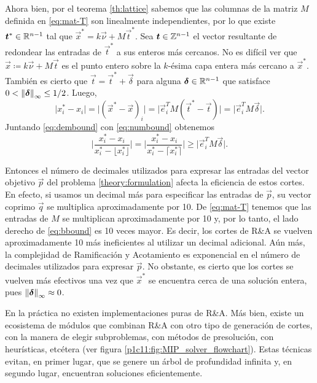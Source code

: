 Ahora bien, por el teorema \ref{th:lattice} sabemos que las columnas de la matriz $M$ definida en
\eqref{eq:mat-T} son linealmente independientes, por lo que existe $\boldsymbol{t}^* \in \mathbb{R}^{n-1}$ tal que
$\vec{x}^* = k\vec{\nu} + M\vec{t}^*$. Sea $\boldsymbol{t} \in \mathbb{Z}^{n-1}$ el vector resultante de redondear
las entradas de $\vec{t}^*$ a sus enteros más cercanos. No es difícil ver que $\vec{x}
\coloneq k\vec{\nu} + M\vec{t}$ es el punto entero sobre la $k$-ésima capa entera más cercano a
$\vec{x}^*$. También es cierto que $\vec{t} = \vec{t}^* + \vec{\delta}$ para alguna $\boldsymbol{\delta}
\in \mathbb{R}^{n-1}$ que satisface $0 < \left\lVert \boldsymbol{\delta} \right\rVert_\infty \leq 1/2$. Luego,
\begin{equation}
	\label{eq:numbound}
	\big| x^*_i - x_i \big| =
	\big| \left(\vec{x}^* - \vec{x}\right)_i \big| =
	\big| \vec{e}_i^TM\left(\vec{t}^* - \vec{t}\right) \big| =
	\big| \vec{e}_i^TM\vec{\delta} \big|.
\end{equation}
Juntando \eqref{eq:dembound} con \eqref{eq:numbound} obtenemos
\begin{equation}
	\label{eq:bbound}
	\bigg| \frac{x_i^* - x_i}{x_i^* - \big\lfloor x_i^*\big\rfloor} \bigg| =
	\bigg| \frac{x_i^* - x_i}{x_i^* - \big\lceil x_i^*\big\rceil} \bigg|
	\geq \big|\vec{e}_i^TM\vec{\delta}\big|.
\end{equation}

Entonces el número de decimales utilizados para expresar las entradas del vector objetivo $\vec{p}$ del problema
\eqref{theory:formulation} afecta la eficiencia de estos cortes. En efecto, si usamos
un decimal más para especificar las entradas de $\vec{p}$, su vector coprimo $\vec{q}$ se
multiplica aproximadamente por 10. De \eqref{eq:mat-T} tenemos que las entradas de $M$ se
multiplican aproximadamente por 10 y, por lo tanto, el lado derecho de \eqref{eq:bbound} es 10 veces mayor.
Es decir, los cortes de R\&A se vuelven aproximadamente 10 más ineficientes al utilizar un decimal
adicional. Aún más, la complejidad de Ramificación y Acotamiento es exponencial en el número de
decimales utilizados para expresar $\vec{p}$. No obstante, es cierto que los cortes se vuelven más
efectivos una vez que $\vec{x}^*$ se encuentra cerca de una solución entera, pues
$\left\lVert \boldsymbol{\delta} \right\rVert_\infty \approx 0$.

En la práctica no existen implementaciones puras de R\&A. Más bien, existe un
ecosistema de módulos que combinan R\&A con otro tipo de generación de cortes, con la manera de
elegir subproblemas, con métodos de presolución, con heurísticas, etcétera (ver figura
\ref{p1c11:fig:MIP_solver_flowchart}). Estas técnicas evitan, en primer lugar, que se genere un
árbol de profundidad infinita y, en segundo lugar, encuentran soluciones eficientemente.


